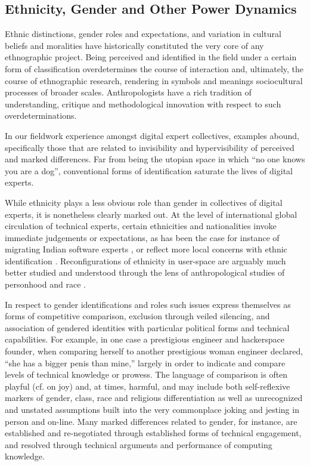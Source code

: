 \documentclass[10pt,letter,oneside]{scrartcl}
\begin{document}
\subsection*{Ethnicity, Gender and Other Power Dynamics}

Ethnic distinctions, gender roles and expectations, and variation in
cultural beliefs and moralities have historically constituted the very
core of any ethnographic project. Being perceived and identified in
the field under a certain form of classification overdetermines the
course of interaction and, ultimately, the course of ethnographic
research, rendering in symbols and meanings sociocultural processes of
broader scales. Anthropologists have a rich tradition of
understanding, critique and methodological innovation with respect to
such overdeterminations. 

In our fieldwork experience amongst digital expert collectives,
examples abound, specifically those that are related to invisibility
and hypervisibility of perceived and marked differences.  Far from
being the utopian space in which ``no one knows you are a dog'',
conventional forms of identification saturate the lives of digital
experts.  

While ethnicity plays a less obvious role than gender in collectives
of digital experts, it is nonetheless clearly marked out.  At the
level of international global circulation of technical experts,
certain ethnicities and nationalities invoke immediate judgements or
expectations, as has been the case for instance of migrating Indian software
experts \cite{xiang2007}, or reflect more local concerns with ethnic
identification \cite{Takhteyev2012,Burrell2012,Chan2013}.  Reconfigurations of
ethnicity in user-space are arguably much better studied and
understood through the lens of anthropological studies of personhood
and race \cite{BOELLSTORFF2008,Miller2011,Nakamura2013}.

In respect to gender identifications and roles such issues
express themselves as forms of competitive comparison, exclusion
through veiled silencing, and association of gendered identities with
particular political forms and technical capabilities.  For example,
in one case a prestigious engineer and hackerspace founder, when
comparing herself to another prestigious woman engineer declared,
``she has a bigger penis than mine,'' largely in order to indicate and
compare levels of technical knowledge or prowess.  The language of
comparison is often playful (cf. \cite{Coleman2013} on joy) and, at
times, harmful, and may include both self-reflexive markers of gender,
class, race and religious differentiation as well as unrecognized and
unstated assumptions built into the very commonplace joking and
jesting in person and on-line.  Many marked differences related to
gender, for instance, are established and re-negotiated through
established forms of technical engagement, and resolved through
technical arguments and performance of computing knowledge.
\end{document}
